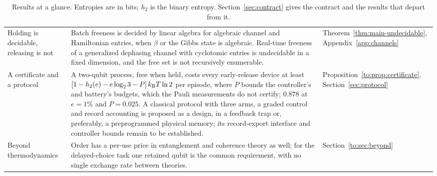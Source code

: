 \begin{table}[tbp]
\begin{tabular}{@{}>{\raggedright\arraybackslash}p{3.1cm}>{\raggedright\arraybackslash}p{10.0cm}>{\raggedright\arraybackslash}p{2.5cm}@{}}
Holding is decidable, releasing is not & Batch freeness is decided by linear algebra for algebraic channel and Hamiltonian entries, when $\beta$ or the Gibbs state is algebraic. Real-time freeness of a generalized dephasing channel with cyclotomic entries is undecidable in a fixed dimension, and the free set is not recursively enumerable. & Theorem~\ref{thm:main-undecidable}, Appendix~\ref{app:channels}\\
A certificate and a protocol & A two-qubit process, free when held, costs every early-release device at least $[1-h_2(e)-e\log_23-P]\,k_{\mathrm B} T\ln2$ per episode, where $P$ bounds the controller's and battery's budgets, which the Pauli measurements do not certify; $0.878$ at $e=1\%$ and $P=0.025$. A classical protocol with three arms, a graded control and record accounting is proposed as a design, in a feedback trap or, preferably, a preprogrammed physical memory; its record-export interface and controller bounds remain to be established. & Proposition~\ref{to:prop:certificate}, Section~\ref{sec:protocol}\\
Beyond thermodynamics & Order has a per-use price in entanglement and coherence theory as well; for the delayed-choice task one retained qubit is the common requirement, with no single exchange rate between theories. & Section~\ref{to:sec:beyond}\\
\bottomrule
\end{tabular}
\caption{Results at a glance. Entropies are in bits; $h_2$ is the binary entropy. Section~\ref{sec:contract} gives the contract and the results that depart from it.}
\label{tab:glance}
\end{table}

